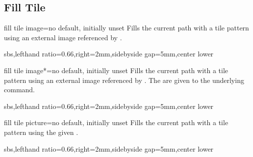 \documentclass{article}
\newenvironment{dispExample*}[1]{\par}{}
\begin{document}
\clearpage
\subsection{Fill Tile}
\begin{docTikzKey}{fill tile image}{=}{no default, initially unset}
  Fills the current path with a tile pattern using an external image referenced by .
\begin{dispExample*}{sbs,lefthand ratio=0.66,right=2mm,sidebyside gap=5mm,center lower}
\end{dispExample*}
\end{docTikzKey}


\begin{docTikzKey}{fill tile image*}{=}{no default, initially unset}
  Fills the current path with a tile pattern using an external image referenced by .
  The  are given to the underlying  command.
\begin{dispExample*}{sbs,lefthand ratio=0.66,right=2mm,sidebyside gap=5mm,center lower}
\end{dispExample*}
\end{docTikzKey}

\begin{docTikzKey}{fill tile picture}{=}{no default, initially unset}
  Fills the current path with a tile pattern using the given .
\begin{dispExample*}{sbs,lefthand ratio=0.66,right=2mm,sidebyside gap=5mm,center lower}
\end{dispExample*}
\end{docTikzKey}
\end{document}
